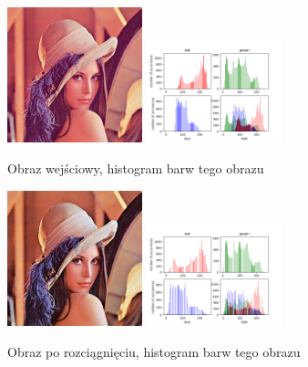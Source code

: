 \documentclass[final,a4paper,openany,12pt]{mwbk}
\begin{document}
\begin{figure}[H]
	\begin{center}
		\includegraphics[width=0.35\textwidth]{lena_color}
		\includegraphics[width=0.35\textwidth]{lena_color_histogram}
	\end{center}
	\caption{Obraz wejściowy, histogram barw tego obrazu}
\end{figure}

\begin{figure}[H]
	\begin{center}
		\includegraphics[width=0.35\textwidth]{lena_color_stretchHist_result}
		\includegraphics[width=0.35\textwidth]{lena_color_stretchHist_histogram}
	\end{center}
	\caption{Obraz po rozciągnięciu, histogram barw tego obrazu}
\end{figure}
\end{document}
